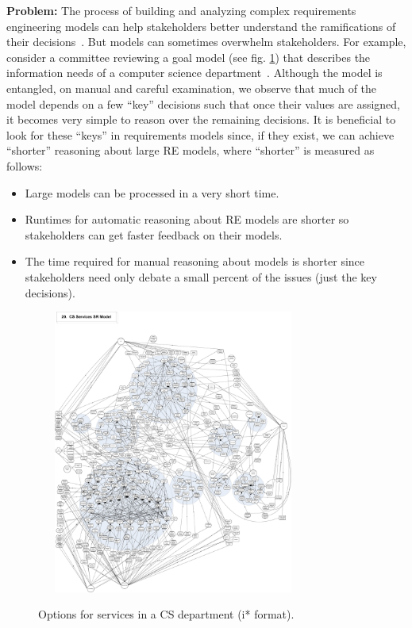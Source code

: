 \documentclass[sigconf,anonymous,review]{acmart}
\begin{document}
    \noindent\textbf{Problem:} The process of building and analyzing complex requirements engineering models can help stakeholders better understand the ramifications of their decisions~\cite{Lamsweerde2001,amyot10}. But models can sometimes overwhelm stakeholders. For example, consider a committee reviewing a goal model (see fig. \ref{fig:csServices}) that describes the information needs of a computer science department~\cite{Horkoff2016}. Although the model is entangled, on manual and careful examination, we observe that much of the model depends on a few ``key'' decisions such that once their values are assigned, it becomes very simple to reason over the remaining decisions. It is beneficial to look for these ``keys'' in requirements models since, if they exist, we can achieve ``shorter'' reasoning about large RE models, where ``shorter'' is measured as follows:
    \begin{itemize}
     \item{Large models can be processed in a very short time.}
     \item{Runtimes for automatic reasoning about RE models are shorter so stakeholders can get faster feedback on their models.}
     \item{The time required for manual reasoning about models is shorter since stakeholders need only debate a small percent of the issues (just the key decisions).}
    \end{itemize}
   
    
    \begin{figure}[!t] 
  ~~~\includegraphics[width=3.1in]{img/CSServices.pdf} 
    \caption{Options for services in a CS department (i* format).}
    \label{fig:csServices}
\end{figure}
\end{document}
